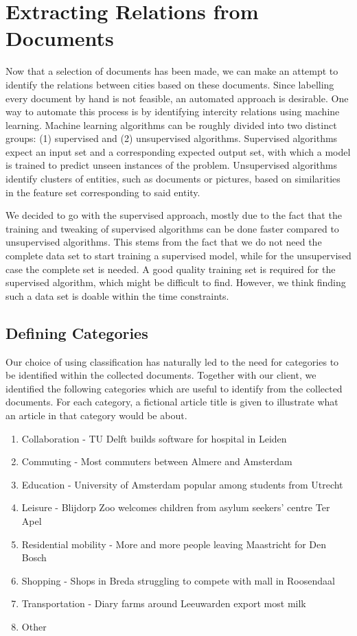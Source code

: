 \section{Extracting Relations from Documents}\label{sec:classification-design}
Now that a selection of documents has been made, we can make an attempt to identify the relations between cities based on these documents. Since labelling every document by hand is not feasible, an automated approach is desirable. 
One way to automate this process is by identifying intercity relations using machine learning. Machine learning algorithms can be roughly divided into two distinct groups: (1) supervised and (2) unsupervised algorithms. Supervised algorithms expect an input set and a corresponding expected output set, with which a model is trained to predict unseen instances of the problem. Unsupervised algorithms identify clusters of entities, such as documents or pictures, based on similarities in the feature set corresponding to said entity.

We decided to go with the supervised approach, mostly due to the fact that the training and tweaking of supervised algorithms can be done faster compared to unsupervised algorithms. This stems from the fact that we do not need the complete data set to start training a supervised model, while for the unsupervised case the complete set is needed. A good quality training set is required for the supervised algorithm, which might be difficult to find. However, we think finding such a data set is doable within the time constraints.

\subsection{Defining Categories}
Our choice of using classification has naturally led to the need for categories to be identified within the collected documents. Together with our client, we identified the following categories which are useful to identify from the collected documents. For each category, a fictional article title is given to illustrate what an article in that category would be about.\\

\begin{enumerate}
    \item Collaboration - TU Delft builds software for hospital in Leiden
    \item Commuting - Most commuters between Almere and Amsterdam
    \item Education - University of Amsterdam popular among students from Utrecht
    \item Leisure - Blijdorp Zoo welcomes children from asylum seekers' centre Ter Apel
    \item Residential mobility - More and more people leaving Maastricht for Den Bosch
    \item Shopping - Shops in Breda struggling to compete with mall in Roosendaal
    \item Transportation - Diary farms around Leeuwarden export most milk
    \item Other
\end{enumerate}

